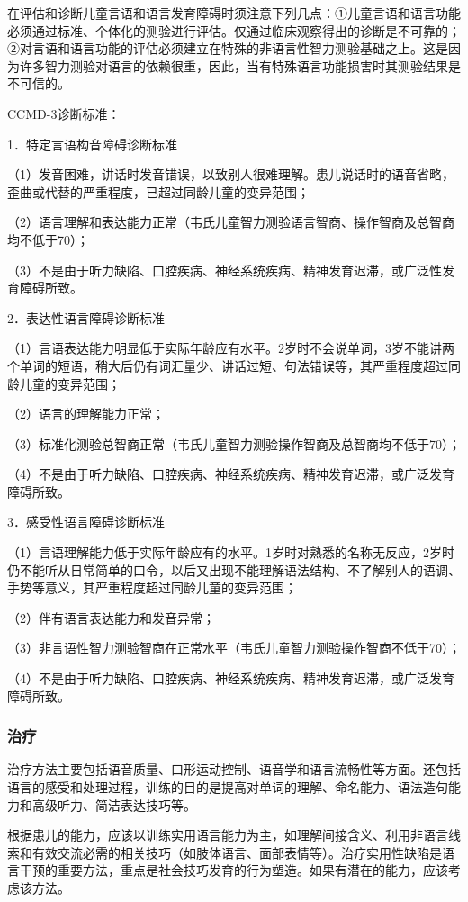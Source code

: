 在评估和诊断儿童言语和语言发育障碍时须注意下列几点：①儿童言语和语言功能必须通过标准、个体化的测验进行评估。仅通过临床观察得出的诊断是不可靠的；②对言语和语言功能的评估必须建立在特殊的非语言性智力测验基础之上。这是因为许多智力测验对语言的依赖很重，因此，当有特殊语言功能损害时其测验结果是不可信的。

CCMD-3诊断标准：

1．特定言语构音障碍诊断标准

（1）发音困难，讲话时发音错误，以致别人很难理解。患儿说话时的语音省略，歪曲或代替的严重程度，已超过同龄儿童的变异范围；

（2）语言理解和表达能力正常（韦氏儿童智力测验语言智商、操作智商及总智商均不低于70）；

（3）不是由于听力缺陷、口腔疾病、神经系统疾病、精神发育迟滞，或广泛性发育障碍所致。

2．表达性语言障碍诊断标准

（1）言语表达能力明显低于实际年龄应有水平。2岁时不会说单词，3岁不能讲两个单词的短语，稍大后仍有词汇量少、讲话过短、句法错误等，其严重程度超过同龄儿童的变异范围；

（2）语言的理解能力正常；

（3）标准化测验总智商正常（韦氏儿童智力测验操作智商及总智商均不低于70）；

（4）不是由于听力缺陷、口腔疾病、神经系统疾病、精神发育迟滞，或广泛发育障碍所致。

3．感受性语言障碍诊断标准

（1）言语理解能力低于实际年龄应有的水平。1岁时对熟悉的名称无反应，2岁时仍不能听从日常简单的口令，以后又出现不能理解语法结构、不了解别人的语调、手势等意义，其严重程度超过同龄儿童的变异范围；

（2）伴有语言表达能力和发音异常；

（3）非言语性智力测验智商在正常水平（韦氏儿童智力测验操作智商不低于70）；

（4）不是由于听力缺陷、口腔疾病、神经系统疾病、精神发育迟滞，或广泛发育障碍所致。

\subsubsection{治疗}

治疗方法主要包括语音质量、口形运动控制、语音学和语言流畅性等方面。还包括语言的感受和处理过程，训练的目的是提高对单词的理解、命名能力、语法造句能力和高级听力、简洁表达技巧等。

根据患儿的能力，应该以训练实用语言能力为主，如理解间接含义、利用非语言线索和有效交流必需的相关技巧（如肢体语言、面部表情等）。治疗实用性缺陷是语言干预的重要方法，重点是社会技巧发育的行为塑造。如果有潜在的能力，应该考虑该方法。

